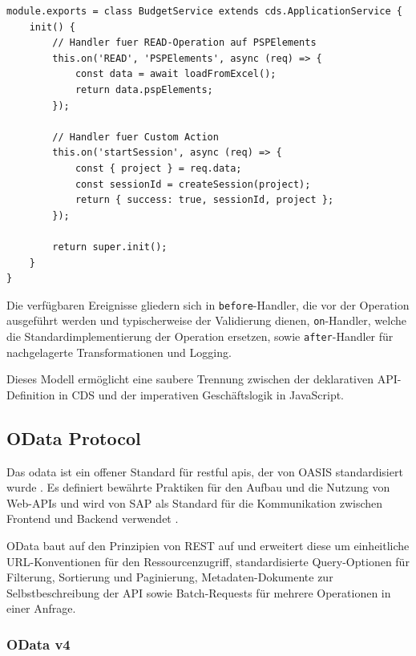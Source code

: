 \begin{lstlisting}[caption={Event Handler in CAP}, label={lst:event-handler}]
module.exports = class BudgetService extends cds.ApplicationService {
    init() {
        // Handler fuer READ-Operation auf PSPElements
        this.on('READ', 'PSPElements', async (req) => {
            const data = await loadFromExcel();
            return data.pspElements;
        });

        // Handler fuer Custom Action
        this.on('startSession', async (req) => {
            const { project } = req.data;
            const sessionId = createSession(project);
            return { success: true, sessionId, project };
        });

        return super.init();
    }
}
\end{lstlisting}

Die verfügbaren Ereignisse gliedern sich in \texttt{before}-Handler, die vor der Operation ausgeführt werden und typischerweise der Validierung dienen, \texttt{on}-Handler, welche die Standardimplementierung der Operation ersetzen, sowie \texttt{after}-Handler für nachgelagerte Transformationen und Logging.

Dieses Modell ermöglicht eine saubere Trennung zwischen der deklarativen API-Definition in CDS und der imperativen Geschäftslogik in JavaScript.

\subsection{OData Protocol}

Das \gls{odata} ist ein offener Standard für \gls{rest}ful \gls{api}s, der von OASIS standardisiert wurde \citep{oasis2020odata}. Es definiert bewährte Praktiken für den Aufbau und die Nutzung von Web-APIs und wird von SAP als Standard für die Kommunikation zwischen Frontend und Backend verwendet \citep{sap2024odata}.

OData baut auf den Prinzipien von REST auf \citep{fielding2000} und erweitert diese um einheitliche URL-Konventionen für den Ressourcenzugriff, standardisierte Query-Optionen für Filterung, Sortierung und Paginierung, Metadaten-Dokumente zur Selbstbeschreibung der API sowie Batch-Requests für mehrere Operationen in einer Anfrage.

\subsubsection{OData v4}

